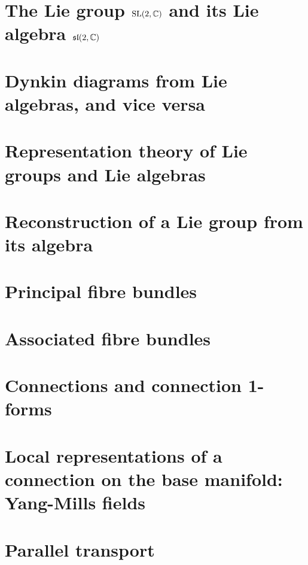 \documentclass[a4paper,11pt]{article}
\theoremstyle{definition}
\theoremstyle{plain}
\theoremstyle{remark}
\begin{document}
\section{The Lie group \texorpdfstring{$\operatorname{SL}(2,\mathbb{C})$}{SL(2,C)} and its Lie algebra \texorpdfstring{$\mathfrak{sl}(2,\mathbb{C})$}{sl(2,C)}}

\newpage

\section{Dynkin diagrams from Lie algebras, and vice versa}

\newpage

\section{Representation theory of Lie groups and Lie algebras}

\newpage

\section{Reconstruction of a Lie group from its algebra}

\newpage

\section{Principal fibre bundles}

\newpage

\section{Associated fibre bundles}

\newpage

\section{Connections and connection 1-forms}

\newpage

\section{Local representations of a connection on the base manifold: Yang-Mills fields}

\newpage

\section{Parallel transport}

\newpage
\end{document}
